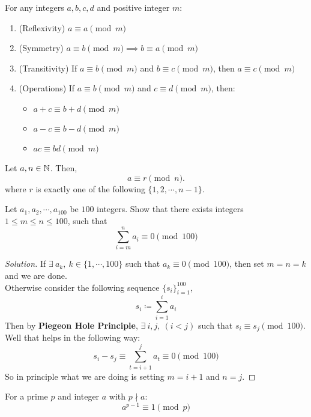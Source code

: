 \documentclass{scrartcl} %
\begin{document}
\begin{theorem}
For any integers $a,b,c,d$ and positive integer $m$:
\begin{enumerate}
    \item (Reflexivity) $a \equiv a \pmod{m}$
    \item (Symmetry) $a \equiv b \pmod{m} \implies b \equiv a \pmod{m}$
    \item (Transitivity) If $a \equiv b \pmod{m}$ and $b \equiv c \pmod{m}$, then $a \equiv c \pmod{m}$
    \item (Operations) If $a \equiv b \pmod{m}$ and $c \equiv d \pmod{m}$, then:
    \begin{itemize}
        \item $a+c \equiv b+d \pmod{m}$
        \item $a-c \equiv b-d \pmod{m}$
        \item $ac \equiv bd \pmod{m}$
    \end{itemize}
\end{enumerate}
\end{theorem}
\begin{lemma}
Let $a,n \in \mathbb N$. Then, \[a \equiv r \pmod{n}.\]
where $r$ is exactly one of the following $\{1,2,\cdots,n-1\}$.
\end{lemma}
\begin{example}
	Let $a_1, a_2,\cdots, a_{100}$ be $100$ integers. Show that there exists integers $1 \leq m \leq n \leq 100$, such that\[\sum\limits_{i = m}^{n} a_i \equiv 0 \pmod{100} \]
\end{example}
\begin{proof}[Solution]
	If $\exists\ a_k, \ k \in \{1,\cdots,100\}$ such that $a_k \equiv 0 \pmod{100}$, then set $m = n = k$ and we are done.\\
	Otherwise consider the following sequence $\{s_i\}_{i = 1}^{100}$,
	\[
		s_i \coloneq \sum_{i = 1}^i a_i
	\]
	Then by \textbf{Piegeon Hole Principle}, $\exists\ i,j,\ \left(i < j\right)$ such that $s_i \equiv s_j \pmod{100}$. Well that helps in the following way:
	\[s_i - s_j \equiv \sum_{t = i + 1}^{j} a_t \equiv 0 \pmod{100}\]
So in principle what we are doing is setting $m = i + 1$ and $n = j$.
\end{proof}
\newpage
\begin{theorem}\label{thm:fermatslittletheorem}
For a prime $p$ and integer $a$ with $p \nmid a$:
\[ a^{p-1} \equiv 1 \pmod{p} \]
\end{theorem}
\end{document}
